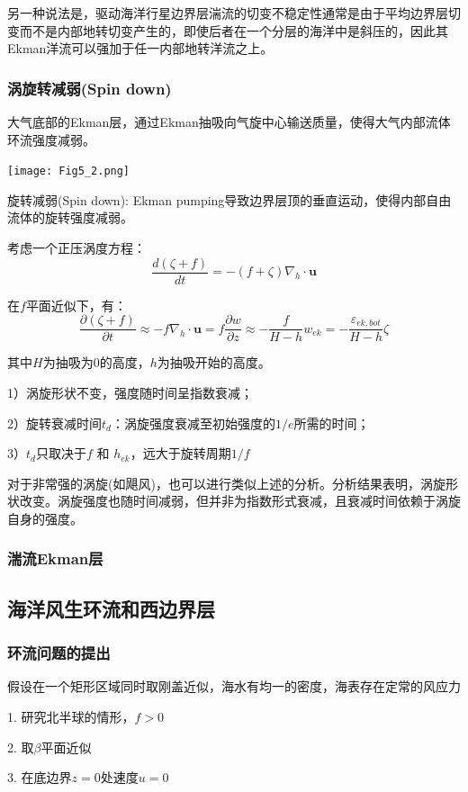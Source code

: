 \documentclass{article}
\begin{document}
另一种说法是，驱动海洋行星边界层湍流的切变不稳定性通常是由于平均边界层切变而不是内部地转切变产生的，即使后者在一个分层的海洋中是斜压的，因此其Ekman洋流可以强加于任一内部地转洋流之上。

\subsubsection{涡旋转减弱(Spin down)}
大气底部的Ekman层，通过Ekman抽吸向气旋中心输送质量，使得大气内部流体环流强度减弱。
\begin{center}
    \texttt{[image: Fig5\_2.png]}
\end{center}
旋转减弱(Spin down): Ekman pumping导致边界层顶的垂直运动，使得内部自由流体的旋转强度减弱。

考虑一个正压涡度方程：
$$\frac{d(\zeta +f)}{dt}=-(f+\zeta ){{\nabla }_{h}}\cdot\mathbf{u}$$

在$f$平面近似下，有：
$$\frac{\partial(\zeta +f)}{\partial t}\approx-f{{\nabla }_{h}}\cdot\mathbf{u}=f\frac{\partial w}{\partial z}\approx-\frac{f}{H-h}w_{ek}=-\frac{{\varepsilon }_{ek,bot}}{H-h}\zeta$$

其中$H$为抽吸为$0$的高度，$h$为抽吸开始的高度。

1）涡旋形状不变，强度随时间呈指数衰减；

2）旋转衰减时间$t_d$：涡旋强度衰减至初始强度的$1/e$所需的时间；

3）$t_d$只取决于$f$ 和 $h_{ek}$，远大于旋转周期$1/f$

对于非常强的涡旋(如飓风)，也可以进行类似上述的分析。分析结果表明，涡旋形状改变。涡旋强度也随时间减弱，但并非为指数形式衰减，且衰减时间依赖于涡旋自身的强度。

\subsubsection{湍流Ekman层}

\subsection{海洋风生环流和西边界层}
\subsubsection{环流问题的提出}
假设在一个矩形区域同时取刚盖近似，海水有均一的密度，海表存在定常的风应力

1. 研究北半球的情形，$f>0$

2. 取$\beta$平面近似

3. 在底边界$z=0$处速度$u=0$
\end{document}
